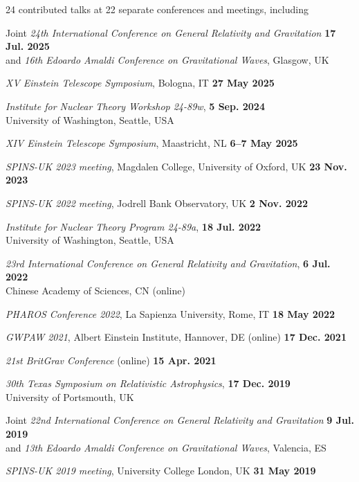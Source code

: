 24 contributed talks at 22 separate conferences and meetings, including

\begin{etaremune}
    \item Joint \textit{24th International Conference on General Relativity and
    Gravitation} \hfill \textbf{17 Jul. 2025} \\
    and \textit{16th Edoardo Amaldi Conference on Gravitational Waves}, Glasgow, UK
    \item \textit{XV Einstein Telescope Symposium}, Bologna, IT
    \hfill \textbf{27 May 2025}
    \item \textit{Institute for Nuclear Theory Workshop 24-89w},
    \hfill \textbf{5 Sep. 2024} \\
    University of Washington, Seattle, USA
    \item \textit{XIV Einstein Telescope Symposium}, Maastricht, NL
    \hfill \textbf{6--7 May 2025}
    \item \textit{SPINS-UK 2023 meeting}, 
    Magdalen College, University of Oxford, UK \hfill \textbf{23 Nov. 2023}
    \item \textit{SPINS-UK 2022 meeting}, Jodrell Bank Observatory, UK
    \hfill \textbf{2 Nov. 2022}
    \item \textit{Institute for Nuclear Theory Program 24-89a},
    \hfill \textbf{18 Jul. 2022} \\
    University of Washington, Seattle, USA
    \item \textit{23rd International Conference on General Relativity and
    Gravitation}, \hfill \textbf{6 Jul. 2022} \\
    Chinese Academy of Sciences, CN (online)
    \item \textit{PHAROS Conference 2022}, La Sapienza University, Rome, IT
    \hfill \textbf{18 May 2022}
    \item \textit{GWPAW 2021}, Albert Einstein Institute, Hannover, DE (online)
    \hfill \textbf{17 Dec. 2021}
    \item \textit{21st BritGrav Conference} (online)
    \hfill \textbf{15 Apr. 2021}
    \item \textit{30th Texas Symposium on Relativistic Astrophysics},
    \hfill \textbf{17 Dec. 2019} \\
    University of Portsmouth, UK
    \item Joint \textit{22nd International Conference on General Relativity and
    Gravitation} \hfill \textbf{9 Jul. 2019} \\
    and \textit{13th Edoardo Amaldi Conference on Gravitational Waves},
    Valencia, ES
    \item \textit{SPINS-UK 2019 meeting}, University College London, UK
    \hfill \textbf{31 May 2019}
\end{etaremune}


